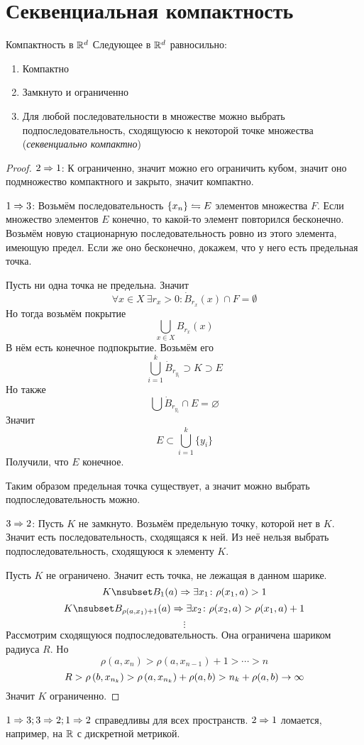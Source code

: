 \section{Секвенциальная компактность}

\begin{theorem}{Компактность в $\mathbb{R}^d$}
Следующее в $\mathbb{R}^d$ равносильно:
\begin{enumerate}
\item Компактно
\item Замкнуто и ограниченно
\item Для любой последовательности в множестве можно выбрать подпоследовательность, сходящуюсю к некоторой точке множества (\textit{секвенциально компактно})
\end{enumerate}
\end{theorem}
\begin{proof}
$2 \Rightarrow 1$: $К$ ограниченно, значит можно его ограничить кубом, значит оно подмножество компактного и закрыто, значит компактно.

$1 \Rightarrow 3$:
Возьмём последовательность $\{x_n\}\leftrightharpoons E$ элементов множества $F$. Если множество элементов $E$ конечно, то какой-то элемент повторился бесконечно. Возьмём новую стационарную последовательность ровно из этого элемента, имеющую предел. Если же оно бесконечно, докажем, что у него есть предельная точка.

Пусть ни одна точка не предельна. Значит 
$$\forall x \in X\: \exists r_x > 0\colon \dot B_{r_x}(x) \cap F = \emptyset$$
Но тогда возьмём покрытие
$$\bigcup_{x\in X} B_{r_x} (x)$$
В нём есть конечное подпокрытие. Возьмём его
$$\bigcup_{i=1}^k \dot B_{r_{y_i}} \supset K \supset E$$
Но также
$$\bigcup \dot B_{r_{y_i}} \cap E = \varnothing$$
Значит 
$$E \subset \bigcup_{i=1}^k \{y_i\}$$
Получили, что $E$ конечное. 

Таким образом предельная точка существует, а значит можно выбрать подпоследовательность можно.

$3 \Rightarrow 2$:
Пусть $K$ не замкнуто. Возьмём предельную точку, которой нет в $K$. Значит есть последовательность, сходящаяся к ней. Из неё нельзя выбрать подпоследовательность, сходящуюся к элементу $K$.

Пусть $K$ не ограничено. Значит есть точка, не лежащая в данном шарике.
$$K \nsubset B_1(a) \Ra \exists x_1\colon \rho(x_1, a) > 1$$
$$K \nsubset B_{\rho(a, x_1) + 1}(a) \Ra \exists x_2\colon \rho(x_2, a) > \rho(x_1, a) + 1$$
$$ \vdots $$
Рассмотрим сходящуюся подпоследовательность. Она ограничена шариком радиуса $R$. Но
$$\rho(a, x_n) > \rho(a, x_{n-1}) + 1 > \cdots > n$$
$$R > \rho\left(b, x_{n_k}\right) > \rho\left(a, x_{n_k}\right) + \rho(a, b) > n_k + \rho(a, b) \rightarrow \infty$$
Значит $K$ ограниченно.  
\end{proof}

\begin{Rem}
$1\Rightarrow 3; 3\Rightarrow 2; 1 \Rightarrow 2$ справедливы для всех пространств. $2 \Rightarrow 1$ ломается, например, на $\mathbb{R}$ с дискретной метрикой.
\end{Rem}
